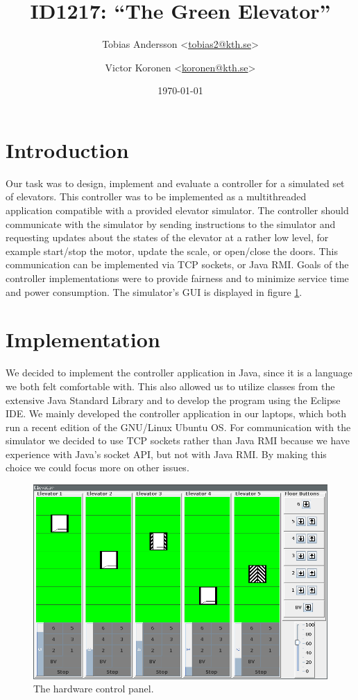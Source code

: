 \documentclass[a4paper]{article}
\title{ID1217: ``The Green Elevator''}
\author{%
    Tobias Andersson <\href{mailto:tobias2@kth.se}{tobias2@kth.se}> \and
    Victor Koronen <\href{mailto:koronen@kth.se}{koronen@kth.se}>
}
\date{\today}
\begin{document}
\maketitle
\thispagestyle{empty}

\section{Introduction}

Our task was to design, implement and evaluate a controller for a simulated set
of elevators. This controller was to be implemented as a multithreaded application compatible with a provided elevator simulator. The controller should communicate with the simulator by sending instructions to the simulator and requesting updates about the states of the elevator at a rather low level, for example start/stop the motor, update the scale, or open/close the doors. This communication can be implemented via TCP sockets, or Java RMI. Goals of the controller implementations were to provide fairness and to minimize service time and power consumption. The simulator's GUI is displayed in figure \ref{fig:hardware_control_panel}.

\section{Implementation}

We decided to implement the controller application in Java, since it is a
language we both felt comfortable with. This also allowed us to utilize classes
from the extensive Java Standard Library and to develop the program using the
Eclipse IDE. We mainly developed the controller application in our laptops,
which both run a recent edition of the GNU/Linux Ubuntu OS. For communication 
with the simulator we decided to use TCP sockets rather than Java RMI because we
have experience with Java's socket API, but not with Java RMI. By making this 
choice we could focus more on other issues.

\begin{figure}[h!]
    \centering
    \includegraphics[width=1.0\textwidth]{images/elevators_5_6.png}
    \caption{The hardware control panel.}
    \label{fig:hardware_control_panel}
\end{figure}
\end{document}
